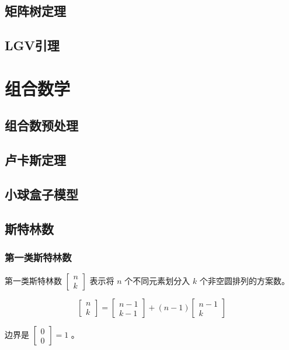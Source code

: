 \documentclass{article}
\begin{document}
\subsection{矩阵树定理}

\subsection{LGV引理}

\section{组合数学}
\subsection{组合数预处理}

\subsection{卢卡斯定理}
\subsection{小球盒子模型}
\subsection{斯特林数}
\subsubsection{第一类斯特林数}

第一类斯特林数 $\begin{bmatrix}n\\k\end{bmatrix}$ 表示将 $n$ 个不同元素划分入 $k$ 个非空圆排列的方案数。

$$
\begin{bmatrix}
n \\ k
\end{bmatrix}
=
\begin{bmatrix}
n-1 \\ k-1
\end{bmatrix}
+
(n-1)\begin{bmatrix}
n-1 \\ k
\end{bmatrix}
$$

边界是 $\begin{bmatrix}0\\0\end{bmatrix}=1$ 。
\end{document}
